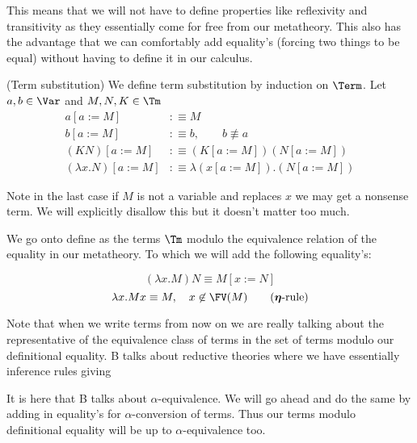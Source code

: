 This means that we will not have to define properties like reflexivity and transitivity as they essentially come for free from our metatheory. This also has the advantage that we can comfortably add equality's (forcing two things to be equal) without having to define it in our calculus.

\begin{defin}(Term substitution)
    We define term substitution by induction on $\Term$. Let $a,b \in \Var$ and $M,N,K \in \Tm$
    \[\begin{aligned}
        a[a := M] &:\equiv M \\
        b[a := M] &:\equiv b, \qquad b \not\equiv a \\
        (K N)[a := M] &:\equiv (K[a:=M])(N[a:=M]) \\
        (\lambda x . N)[a := M] &:\equiv \lambda (x[a := M]) . (N[a := M])
    \end{aligned}\]
    
    Note in the last case if $M$ is not a variable and replaces $x$ we may get a nonsense term. We will explicitly disallow this but it doesn't matter too much.
\end{defin}

We go onto define \utbe  as the terms $\Tm$ modulo the equivalence relation of the equality in our metatheory. To which we will add the following equality's:

\[(\lambda x . M) N \equiv M[x := N]\tag{$\boldsymbol \beta$-rule}\]
\[\lambda x . M x \equiv M, \quad x \not\in \FV(M)\tag{$\boldsymbol \eta$-rule}\]

Note that when we write terms from now on we are really talking about the representative of the equivalence class of terms in the set of terms modulo our definitional equality. B talks about reductive theories where we have essentially inference rules giving 


\begin{remark}
It is here that B talks about $\alpha$-equivalence. We will go ahead and do the same by adding in equality's for $\alpha$-conversion of terms. Thus our terms modulo definitional equality will be up to $\alpha$-equivalence too.
\end{remark}

